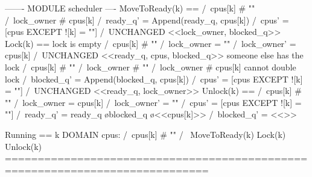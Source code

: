 \begin{tla}
------- MODULE scheduler ---- 
MoveToReady(k) == 
    /\ cpus[k] # "" 
    /\ lock_owner # cpus[k]
    /\ ready_q' = Append(ready_q, cpus[k]) 
    /\ cpus' = [cpus EXCEPT ![k] = ""]
    /\ UNCHANGED <<lock_owner, blocked_q>>
Lock(k) == 
    \* lock is empty
    \/  /\ cpus[k] # "" 
        /\ lock_owner = ""
        /\ lock_owner' = cpus[k]
        /\ UNCHANGED <<ready_q, cpus, blocked_q>>
    \* someone else has the lock
    \/  /\ cpus[k] # "" 
        /\ lock_owner # ""
        /\ lock_owner # cpus[k] \* cannot double lock
        /\ blocked_q' = Append(blocked_q, cpus[k])
        /\ cpus' = [cpus EXCEPT ![k] = ""]
        /\ UNCHANGED <<ready_q, lock_owner>>
Unlock(k) == 
    /\ cpus[k] # "" 
    /\ lock_owner = cpus[k]
    /\ lock_owner' = ""
    /\ cpus' = [cpus EXCEPT ![k] = ""]
    /\ ready_q' = ready_q \o blocked_q \o <<cpus[k]>>
    /\ blocked_q' = <<>>

Running == 
    \E k \in DOMAIN cpus:
        /\ cpus[k] # "" 
        /\ \/ MoveToReady(k)
           \/ Lock(k)
           \/ Unlock(k)
=============================================================================
\end{tla}
